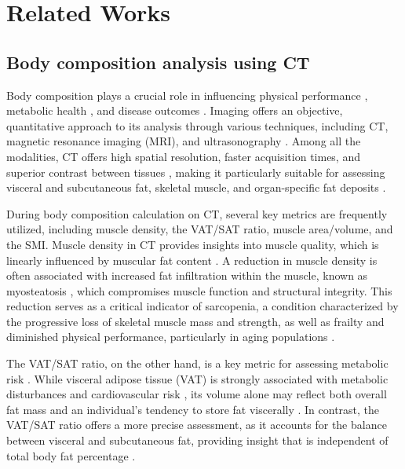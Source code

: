 \section{Related Works}
\subsection{Body composition analysis using CT}
Body composition plays a crucial role in influencing physical performance \citep{hernandez2024relationship, falsarella2015body}, metabolic health \citep{trouwborst2024body, kakinami2022body}, and disease outcomes \citep{rutten2016loss}. Imaging offers an objective, quantitative approach to its analysis through various techniques, including CT, magnetic resonance imaging (MRI), and ultrasonography \citep{hou2024enhanced, tan2024quantitative, sharafi2024quantitative, xu2024value}. Among all the modalities, CT offers high spatial resolution, faster acquisition times, and superior contrast between tissues \citep{zhang2021improving}, making it particularly suitable for assessing visceral and subcutaneous fat, skeletal muscle, and organ-specific fat deposits \citep{wathen2013vivo}. 

During body composition calculation on CT, several key metrics are frequently utilized, including muscle density, the VAT/SAT ratio, muscle area/volume, and the SMI. Muscle density in CT provides insights into muscle quality, which is linearly influenced by muscular fat content \citep{engelke2018quantitative}. A reduction in muscle density is often associated with increased fat infiltration within the muscle, known as myosteatosis \citep{chang2024prognostic}, which compromises muscle function and structural integrity. This reduction serves as a critical indicator of sarcopenia, a condition characterized by the progressive loss of skeletal muscle mass and strength, as well as frailty and diminished physical performance, particularly in aging populations \citep{cawthon2015assessment}. 

The VAT/SAT ratio, on the other hand, is a key metric for assessing metabolic risk \citep{kaess2012ratio, oh2017visceral}. While visceral adipose tissue (VAT) is strongly associated with metabolic disturbances and cardiovascular risk \citep{vasamsetti2023regulation}, its volume alone may reflect both overall fat mass and an individual's tendency to store fat viscerally \citep{kaess2012ratio}. In contrast, the VAT/SAT ratio offers a more precise assessment, as it accounts for the balance between visceral and subcutaneous fat, providing insight that is independent of total body fat percentage \citep{kaess2012ratio}.

